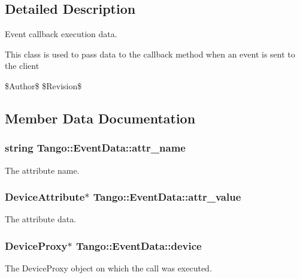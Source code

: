 \subsection{Detailed Description}
Event callback execution data. 

This class is used to pass data to the callback method when an event is sent to the client

\$\-Author\$ \$\-Revision\$ 

\subsection{Member Data Documentation}
\subsubsection[{attr\-\_\-name}]{\setlength{\rightskip}{0pt plus 5cm}string Tango\-::\-Event\-Data\-::attr\-\_\-name}\label{classTango_1_1EventData_a0bd1e69e134e164209b86a4630357934}


The attribute name. 

\subsubsection[{attr\-\_\-value}]{\setlength{\rightskip}{0pt plus 5cm}Device\-Attribute$\ast$ Tango\-::\-Event\-Data\-::attr\-\_\-value}\label{classTango_1_1EventData_a5c709e4322db6f5129abf5063044c4a7}


The attribute data. 

\subsubsection[{device}]{\setlength{\rightskip}{0pt plus 5cm}Device\-Proxy$\ast$ Tango\-::\-Event\-Data\-::device}\label{classTango_1_1EventData_ae56b5ea4399a060a10cba21884fc7a40}


The Device\-Proxy object on which the call was executed. 


